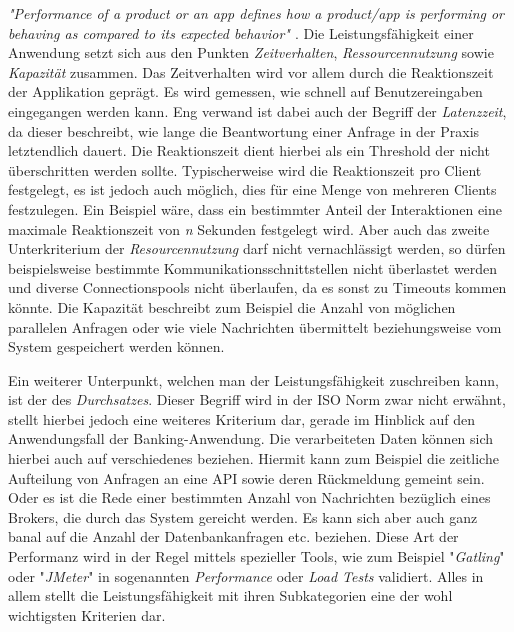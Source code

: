 \emph{"Performance of a product or an app defines how a product/app is performing or behaving as compared to its expected behavior" \cite{nfr-dotnetcurry}}. Die Leistungsfähigkeit einer Anwendung setzt sich aus den Punkten \emph{Zeitverhalten}, \emph{Ressourcennutzung} sowie \emph{Kapazität} zusammen. Das Zeitverhalten wird vor allem durch die Reaktionszeit der Applikation geprägt. Es wird gemessen, wie schnell auf Benutzereingaben eingegangen werden kann. Eng verwand ist dabei auch der Begriff der \emph{Latenzzeit}, da dieser beschreibt, wie lange die Beantwortung einer Anfrage in der Praxis letztendlich dauert. Die Reaktionszeit dient hierbei als ein Threshold der nicht überschritten werden sollte. Typischerweise wird die Reaktionszeit pro Client festgelegt, es ist jedoch auch möglich, dies für eine Menge von mehreren Clients festzulegen. Ein Beispiel wäre, dass ein bestimmter Anteil der Interaktionen eine maximale Reaktionszeit von \emph{n} Sekunden festgelegt wird. Aber auch das zweite Unterkriterium der \emph{Resourcennutzung} darf nicht vernachlässigt werden, so dürfen beispielsweise bestimmte Kommunikationsschnittstellen nicht überlastet werden und diverse Connectionspools nicht überlaufen, da es sonst zu Timeouts kommen könnte. Die Kapazität beschreibt zum Beispiel die Anzahl von möglichen parallelen Anfragen oder wie viele Nachrichten übermittelt beziehungsweise vom System gespeichert werden können. 

Ein weiterer Unterpunkt, welchen man der Leistungsfähigkeit zuschreiben kann, ist der des \emph{Durchsatzes}. Dieser Begriff wird in der ISO Norm zwar nicht erwähnt, stellt hierbei jedoch eine weiteres Kriterium dar, gerade im Hinblick auf den Anwendungsfall der Banking-Anwendung. Die verarbeiteten Daten können sich hierbei auch auf verschiedenes beziehen. Hiermit kann zum Beispiel die zeitliche Aufteilung von Anfragen an eine API sowie deren Rückmeldung gemeint sein. Oder es ist die Rede einer bestimmten Anzahl von Nachrichten bezüglich eines Brokers, die durch das System gereicht werden. Es kann sich aber auch ganz banal auf die Anzahl der Datenbankanfragen etc. beziehen. Diese Art der Performanz wird in der Regel mittels spezieller Tools, wie zum Beispiel "\emph{Gatling}" oder "\emph{JMeter}" in sogenannten \emph{Performance} oder \emph{Load Tests} validiert. Alles in allem stellt die Leistungsfähigkeit mit ihren Subkategorien eine der wohl wichtigsten Kriterien dar.


